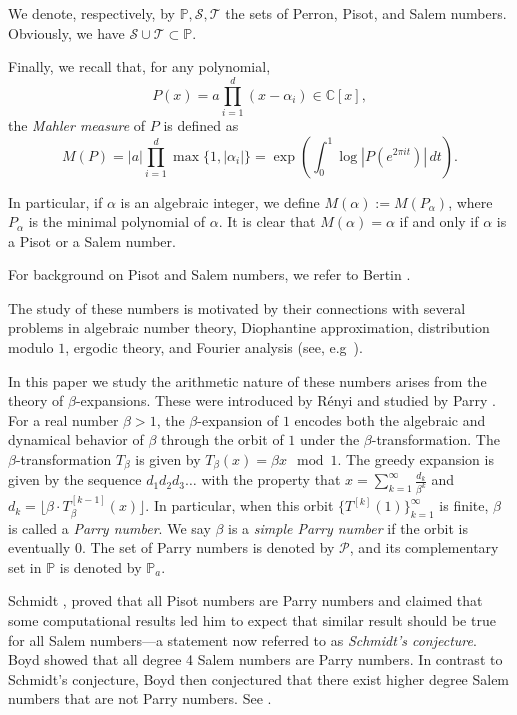 \documentclass[12pt]{article}
\theoremstyle{plain}
\theoremstyle{remark}
\begin{document}
We denote, respectively, by $\mathbb{P}, \mathcal{S}, \mathcal{T}$ the sets of Perron, Pisot, and Salem numbers. 
Obviously, we have $\mathcal{S} \cup \mathcal{T} \subset \mathbb{P}$.

Finally, we recall that, for any polynomial, 
\[
P(x) = a \prod_{i=1}^d (x-\alpha_i) \in \mathbb{C}[x],
\] 
the \emph{Mahler measure} of $P$ is defined as
\[
M(P) = |a| \prod_{i=1}^d \max \{1, |\alpha_i|\}=\exp\!\left(\int_0^1 \log\left|P\!\left(e^{2\pi i t}\right)\right|\,dt\right).
\]

In particular, if $\alpha$ is an algebraic integer, we define $M(\alpha) := M(P_\alpha)$, where $P_\alpha$ is the minimal polynomial of $\alpha$. It is clear that $M(\alpha) = \alpha$ if and only if $\alpha$ is a Pisot or a Salem number.

For background on Pisot and Salem numbers, we refer to Bertin \cite{Bertin1992}.

The study of these numbers is motivated by their connections with several problems in algebraic number theory, Diophantine approximation, distribution modulo $1$, ergodic theory, and Fourier analysis (see, e.g~\cite{SA07, GH99, Sal63, JS97, Sch80}).

In this paper we study the arithmetic nature of these numbers arises from the theory of $\beta$-expansions.  These were introduced by Rényi \cite{Ren57} and studied by Parry \cite{Par60}. For a real number $\beta > 1$, the $\beta$-expansion of $1$ encodes both the algebraic and dynamical behavior of $\beta$ through the orbit of $1$ under the $\beta$-transformation. 
The $\beta$-transformation $T_\beta$ is given by $T_\beta(x) = \beta x \mod 1$.
The greedy expansion is given by the sequence $d_1 d_2 d_3 \dots$ with the property that $x = \sum_{k=1}^\infty \frac{d_k}{\beta^k}$ and $d_k = \lfloor\beta\cdot T_\beta^{[k-1]}(x)\rfloor$. 
In particular, when this orbit $\{T^{[k]}(1)\}_{k=1}^\infty$ is finite, $\beta$ is called a \emph{Parry number}. We say $\beta$ is a \emph{simple Parry number} if the orbit is eventually $0$. The set of Parry numbers is denoted by $\mathcal{P}$, and its complementary set in $\mathbb{P}$ is denoted by $\mathbb{P}_a$.

Schmidt \cite{Sch80}, proved that all Pisot numbers are Parry numbers and claimed that some computational results led him to expect that similar result should be true for all Salem numbers---a statement now referred to as \emph{Schmidt's conjecture}.
Boyd showed that all degree 4 Salem numbers are Parry numbers.
In contrast to Schmidt's conjecture, Boyd then conjectured that there exist higher degree Salem numbers that are not Parry numbers.
See \cite{Boyd1989}.
\end{document}
